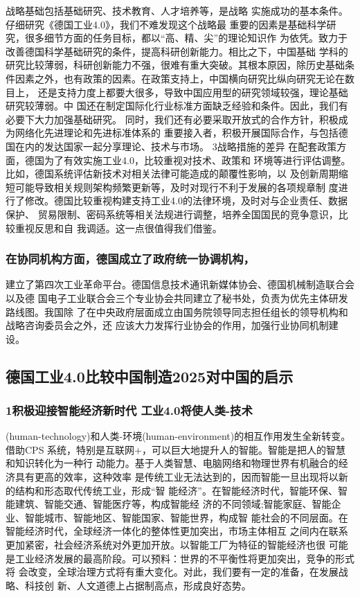 \documentclass[11pt]{ctexart}
\begin{document}
{{{{战略基础包括基础研究、技术教育、人才培养等，是战略
实施成功的基本条件。仔细研究《德国工业4.0》，我们不难发现这个战略最
重要的因素是基础科学研究，很多细节方面的任务目标，都以“高、精、尖”的理论知识作
为依凭。致力于改善德国科学基础研究的条件，提高科研创新能力。相比之下，中国基础
学科的研究比较薄弱，科研创新能力不强，很难有重大突破。其根本原因，除历史基础条
件因素之外，也有政策的因素。在政策支持上，中国横向研究比纵向研究无论在数目上，
还是支持力度上都要大很多，导致中国应用型的研究领域较强，理论基础研究较薄弱。中
国还在制定国际化行业标准方面缺乏经验和条件。因此，我们有必要下大力加强基础研究。
同时，我们还有必要采取开放式的合作方针，积极成为网络化先进理论和先进标准体系的
重要接入者，积极开展国际合作，与包括德国在内的发达国家一起分享理论、技术与市场。
3战略措施的差异 在配套政策方面，德国为了有效实施工业4.0，比较重视对技术、政策和
环境等进行评估调整。比如，德国系统评估新技术对相关法律可能造成的颠覆性影响，以
及创新周期缩短可能导致相关规则架构频繁更新等，及时对现行不利于发展的各项规章制
度进行了修改。德国比较重视构建支持工业4.0的法律环境，及时对与企业责任、数据保护、
贸易限制、密码系统等相关法规进行调整，培养全国国民的竞争意识，比较重视反思和自
我调适。这一点很值得我们借鉴。

\subsubsection{在协同机构方面，德国成立了政府统一协调机构，}
\label{sec:orgefc12f9}

建立了第四次工业革命平台。德国信息技术通讯新媒体协会、德国机械制造联合会以及德
国电子工业联合会三个专业协会共同建立了秘书处，负责为优先主体研发路线图。我国除
了在中央政府层面成立由国务院领导同志担任组长的领导机构和战略咨询委员会之外，还
应该大力发挥行业协会的作用，加强行业协同机制建设。

\subsection{德国工业4.0比较中国制造2025对中国的启示}
\label{sec:orge09a219}

\subsubsection{1积极迎接智能经济新时代 工业4.0将使人类-技术}
\label{sec:org5e4f390}
(human-technology)和人类-环境(human-environment)的相互作用发生全新转变。借助CPS
系统，特别是互联网+，可以巨大地提升人的智能。智能是把人的智慧和知识转化为一种行
动能力。基于人类智慧、电脑网络和物理世界有机融合的经济具有更高的效率，这种效率
是传统工业无法达到的，因而智能一旦出现将以新的结构和形态取代传统工业，形成“智
能经济”。在智能经济时代，智能环保、智能建筑、智能交通、智能医疗等，构成智能经
济的不同领域;智能家庭、智能企业、智能城市、智能地区、智能国家、智能世界，构成智
能社会的不同层面。在智能经济时代，全球经济一体化的整体性更加突出，市场主体相互
之间内在联系更加紧密，社会经济系统对外更加开放。以智能工厂为特征的智能经济也很
可能是工业经济发展的最高阶段。可以预料：世界的不平衡性将更加突出，竞争的形式将
会改变，全球治理方式将有重大变化。对此，我们要有一定的准备，在发展战略、科技创
新、人文道德上占据制高点，形成良好态势。

}}}}
\end{document}
